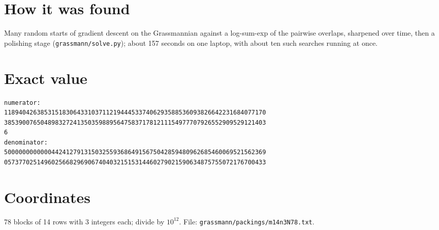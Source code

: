 \documentclass[11pt,a4paper]{article}
\begin{document}
\section{How it was found}
Many random starts of gradient descent on the Grassmannian against a log-sum-exp of the pairwise overlaps, sharpened over time, then a polishing stage (\texttt{grassmann/solve.py}); about 157 seconds on one laptop, with about ten such searches running at once.


\appendix
\section{Exact value}
{\small
\begin{verbatim}
numerator:
118940426385315183064331037112194445337406293588536093826642231684077170
385390076504898327241350359889564758371781211154977707926552909529121403
6
denominator:
500000000000044241279131503255936864915675042859480962685460069521562369
057377025149602566829690674040321515314460279021590634875755072176700433
\end{verbatim}}

\section{Coordinates}
78 blocks of 14 rows with 3 integers each; divide by $10^{12}$. File: \texttt{grassmann/packings/m14n3N78.txt}.
{\tiny
\begin{multicols}{3}
\end{multicols}}
\end{document}
